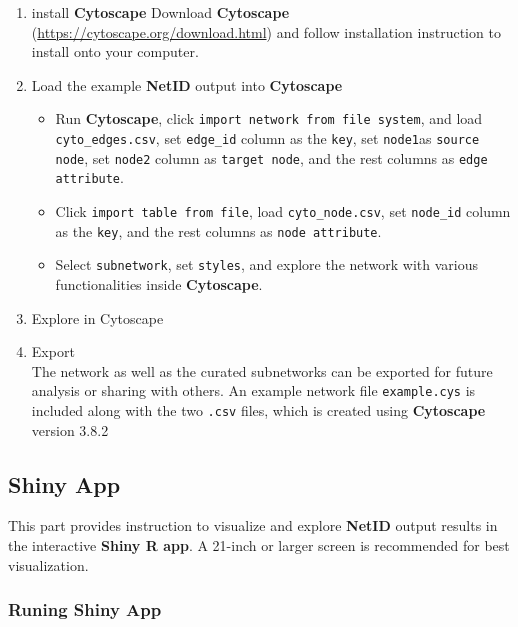 \documentclass[]{article}
\providecommand{\tightlist}{%
  \setlength{\itemsep}{0pt}\setlength{\parskip}{0pt}}
\begin{document}
\begin{enumerate}
\def\labelenumi{\arabic{enumi}.}
\item
  install \textbf{Cytoscape}
  Download \textbf{Cytoscape} (\url{https://cytoscape.org/download.html}) and follow installation instruction to install onto your computer.
\item
  Load the example \textbf{NetID} output into \textbf{Cytoscape}

  \begin{itemize}
  \tightlist
  \item
    Run \textbf{Cytoscape}, click \texttt{import network from file system}, and load \texttt{cyto\_edges.csv}, set \texttt{edge\_id} column as the \texttt{key}, set \texttt{node1}as \texttt{source node}, set \texttt{node2} column as \texttt{target node}, and the rest columns as \texttt{edge attribute}.\\
  \item
    Click \texttt{import table from file}, load \texttt{cyto\_node.csv}, set \texttt{node\_id} column as the \texttt{key}, and the rest columns as \texttt{node attribute}.
  \item
    Select \texttt{subnetwork}, set \texttt{styles}, and explore the network with various functionalities inside \textbf{Cytoscape}.
  \end{itemize}
\item
  Explore in Cytoscape
\item
  Export\\
  The network as well as the curated subnetworks can be exported for future analysis or sharing with others. An example network file \texttt{example.cys} is included along with the two \texttt{.csv} files, which is created using \textbf{Cytoscape} version 3.8.2
\end{enumerate}

\hypertarget{shiny-app}{%
\subsection{Shiny App}\label{shiny-app}}

This part provides instruction to visualize and explore \textbf{NetID} output results in the interactive \textbf{Shiny R app}. A 21-inch or larger screen is recommended for best visualization.

\hypertarget{runing-shiny-app}{%
\subsubsection{Runing Shiny App}\label{runing-shiny-app}}
\end{document}
